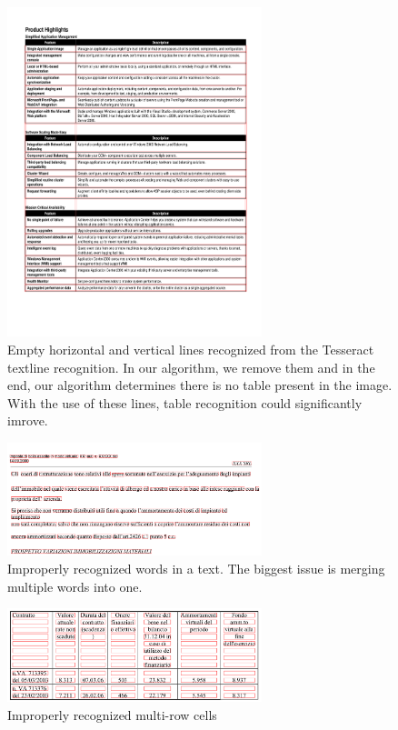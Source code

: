 \begin{figure}[t]
\centering
\includegraphics[width=20em]{img/results/errorTableBordered.png}
\caption{Empty horizontal and vertical lines recognized from the Tesseract textline recognition. In our algorithm, we remove them and in the end, our algorithm determines there is no table present in the image. With the use of these lines, table recognition could significantly imrove.}
\label{fig:errorTableBordered}
\end{figure}

\begin{figure}[t]
\centering
\includegraphics[width=20em]{img/results/errorWordWhitespace.png}
\caption{Improperly recognized words in a text. The biggest issue is merging multiple words into one.}
\label{fig:errorWordWs}
\end{figure}

\begin{figure}[t]
\centering
\includegraphics[width=20em]{img/results/errorMultiRow.png}
\caption{Improperly recognized multi-row cells}
\label{fig:errorMultiRow}
\end{figure}

